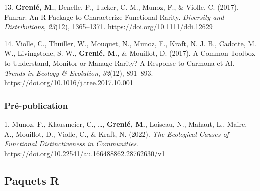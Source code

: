 \documentclass[10pt,a4paper,]{article}
\begin{document}
\leavevmode{}%
13. \textbf{Grenié, M.}, Denelle, P., Tucker, C. M., Munoz, F., \&
Violle, C. (2017). Funrar: An R Package to Characterize Functional
Rarity. \emph{Diversity and Distributions}, \emph{23}(12), 1365--1371.
\url{https://doi.org/10.1111/ddi.12629}

\leavevmode{}%
14. Violle, C., Thuiller, W., Mouquet, N., Munoz, F., Kraft, N. J. B.,
Cadotte, M. W., Livingstone, S. W., \textbf{Grenié, M.}, \& Mouillot, D.
(2017). A Common Toolbox to Understand, Monitor or Manage Rarity? A
Response to Carmona et Al. \emph{Trends in Ecology \& Evolution},
\emph{32}(12), 891--893.
\url{https://doi.org/10.1016/j.tree.2017.10.001}

\hypertarget{pruxe9-publication}{%
\subsubsection{Pré-publication}\label{pruxe9-publication}}

\hypertarget{bibliography}{}
\leavevmode{}%
1. Munoz, F., Klausmeier, C., \ldots, \textbf{Grenié, M.}, Loiseau, N.,
Mahaut, L., Maire, A., Mouillot, D., Violle, C., \& Kraft, N. (2022).
\emph{The Ecological Causes of Functional Distinctiveness in
Communities}. \url{https://doi.org/10.22541/au.166488862.28762630/v1}

\hypertarget{paquets-r}{%
\subsection{Paquets R}\label{paquets-r}}
\end{document}
